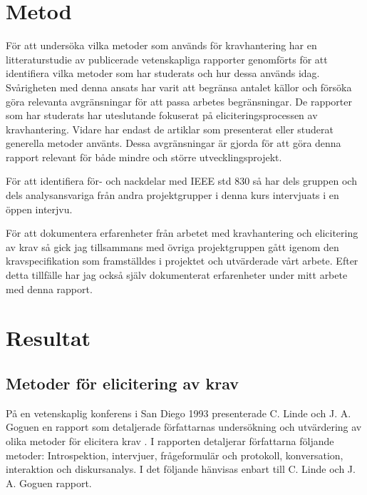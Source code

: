 \section{Metod}
\label{sec:method-jannering}

För att undersöka vilka metoder som används för kravhantering har en litteraturstudie av publicerade vetenskapliga rapporter genomförts för att identifiera vilka metoder som har studerats och hur dessa används idag. Svårigheten med denna ansats har varit att begränsa antalet källor och försöka göra relevanta avgränsningar för att passa arbetes begränsningar. De rapporter som har studerats har uteslutande fokuserat på eliciteringsprocessen av kravhantering. Vidare har endast de artiklar som presenterat eller studerat generella metoder använts. Dessa avgränsningar är gjorda för att göra denna rapport relevant för både mindre och större utvecklingsprojekt.
  
För att identifiera för- och nackdelar med IEEE std 830 \cite{ieee1998ieee} så har dels gruppen och dels analysansvariga från andra projektgrupper i denna kurs intervjuats i en öppen interjvu.

För att dokumentera erfarenheter från arbetet med kravhantering och elicitering av krav så gick jag tillsammans med övriga projektgruppen gått igenom den kravspecifikation som framställdes i projektet och utvärderade vårt arbete. Efter detta tillfälle har jag också själv dokumenterat erfarenheter under mitt arbete med denna rapport.




\section{Resultat}
\label{sec:results-jannering}
\subsection{Metoder för elicitering av krav}
På en vetenskaplig konferens i San Diego 1993 presenterade C. Linde och J. A. Goguen en rapport som detaljerade författarnas undersökning och utvärdering av olika metoder för elicitera krav \cite{goguen1993techniques}. I rapporten detaljerar författarna följande metoder: Introspektion, intervjuer, frågeformulär och protokoll, konversation, interaktion och diskursanalys. I det följande hänvisas enbart till C. Linde och J. A. Goguen rapport. \cite{goguen1993techniques}

